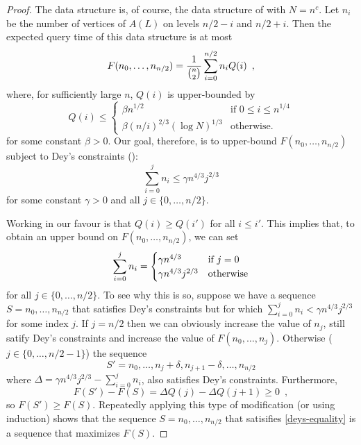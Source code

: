 \documentclass{cccg12}
\begin{document}
\begin{proof}
  The data structure is, of course, the data structure of
   with $N=n^c$.  Let $n_i$ be the number of vertices
  of $A(L)$ on levels $n/2-i$ and $n/2+i$.  Then the expected query time
  of this data structure is at most
  \begin{equation}
    F(n_0,\ldots,n_{n/2}) 
      = \frac{1}{\binom{n}{2}}\sum_{i=0}^{n/2} n_i Q(i) \enspace ,
     \eqlabel{expected}
  \end{equation}
  where, for sufficiently large $n$, $Q(i)$ is upper-bounded by
  \[
        Q(i) \le \begin{cases}
          \beta n^{1/2} & \text{if $0\le i \le n^{1/4}$} \\
          \beta (n/i)^{2/3}(\log N)^{1/3}  & \text{otherwise} .
        \end{cases}
  \]
  for some constant $\beta>0$.   Our goal, therefore, is to upper-bound
  $F(n_0,\ldots,n_{n/2})$ subject to Dey's constraints ():
  \[
     \sum_{i=0}^{j}n_i \le \gamma n^{4/3}j^{2/3} 
  \]
  for some constant $\gamma>0$ and all $j\in\{0,\ldots,n/2\}$.

  Working in our favour is that $Q(i) \ge Q(i')$ for all $i \le i'$.
  This implies that, to obtain an upper bound on $F(n_0,\ldots,n_{n/2})$,
  we can set
  \begin{equation}
      \sum_{i=0}^{j}n_i = 
        \begin{cases}
           \gamma n^{4/3} & \text{if $j=0$} \\
           \gamma n^{4/3}j^{2/3} & \text{otherwise}
        \end{cases}  \eqlabel{deys-equality}
  \end{equation}
  for all $j\in\{0,\ldots,n/2\}$.  To see why this is so, suppose we have
  a sequence $S=n_0,\ldots,n_{n/2}$ that satisfies Dey's constraints
  but for which $\sum_{i=0}^{j}n_i < \gamma n^{4/3}j^{2/3}$ for some index
  $j$. If $j=n/2$ then we can obviously increase the value of $n_j$, still
  satify Dey's constraints and increase the value of $F(n_0,\ldots,n_j)$.
  Otherwise ($j\in\{0,\ldots,n/2-1\}$) the sequence
  \[
     S'=n_0,\ldots,n_{j}+\delta,n_{j+1}-\delta,\ldots,n_{n/2}
  \]
  where $\Delta=\gamma n^{4/3}j^{2/3}-\sum_{i=0}^{j}n_i$, also satisfies
  Dey's constraints.  Furthermore, 
  \[  F(S')-F(S) = \Delta Q(j) - \Delta Q(j+1) \ge 0 \enspace , \]
  so $F(S')\ge F(S)$.  Repeatedly applying this type of modification (or
  using induction) shows that the sequence $S=n_0,\ldots,n_{n/2}$ that
  satisifies \eqref{deys-equality} is a sequence that maximizes $F(S)$.


\end{proof}
\end{document}
